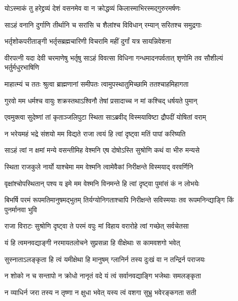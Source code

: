 \twolineshloka
{योऽस्माकं तु हरेद्द्रव्यं देशं वसनमेव वा}
{न क्रोद्धव्यं किलास्माभिरस्मद्गुरुरमर्षणः}


\twolineshloka
{साऽहं वनानि दुर्गाणि तीर्थानि च सरांसि च}
{शैलांश्च विविधान् रम्यान् सरितश्च समुद्रगाः}


\twolineshloka
{भर्तृशोकपरीताङ्गी भर्तृसब्रह्मचारिणी}
{विचरामि महीं दुर्गां यत्र सायन्निवेशना}


\threelineshloka
{वीरपत्नी यदा देवी चरमाणेषु भर्तृषु}
{साऽहं विवत्सा विधिना गन्धमादनपर्वतात्}
{शृणोमि तव सौशील्यं भर्तुर्मधुरभाषिणि}


\twolineshloka
{माहात्म्यं च ततः श्रुत्वा ब्राह्मणानां समीपतः}
{त्वामुपस्थातुमिच्छामि ततश्चाहमिहागता}


\twolineshloka
{गुरवो मम धर्मश्च वायुः शक्रस्तथाऽश्विनौ}
{तेषां प्रसादाच्च न मां कश्चिद् धर्षयते पुमान्}



\twolineshloka
{एवमुक्त्वा सुदेष्णां तां कृताञ्जलिपुटा स्थिता}
{साऽब्रवीद् विस्मयाविष्टा द्रौपदीं योषितां वराम्}


\twolineshloka
{न भरेयमहं भद्रे संशयो मम विद्यते}
{राजा त्वयं हि त्वां दृष्ट्वा मतिं पापां करिष्यति}


\twolineshloka
{साऽहं त्वां न क्षमां मन्ये वसन्तीमिह वेश्मनि}
{एष दोषोऽस्ति सुश्रोणि कथं वा भीरु मन्यसे}


\twolineshloka
{स्थिता राजकुले नार्यो याश्चेमा मम वेश्मनि}
{त्वामेवैकां निरीक्षन्ते विस्मयाद् वरवर्णिनि}


\twolineshloka
{वृक्षांश्चोपस्थितान् पश्य य इमे मम वेश्मनि}
{विनमन्ते हि त्वां दृष्ट्वा पुमांसं कं न लोभयेः}


\threelineshloka
{बिभर्षि परमं रूपमतिमानुषमद्भुतम्}
{तिर्यग्योनिगताश्चापि निरीक्षन्ते सविस्मयाः}
{तव रूपमनिन्द्याङ्गि किं पुनर्मानवा भुवि}


\twolineshloka
{राजा विराटः सुश्रोणि दृष्ट्वा ते परमं वपुः}
{मां विहाय वरारोहे त्वां गच्छेत् सर्वचेतसा}


\twolineshloka
{यं हि त्वमनवद्याङ्गी नरमायतलोचने}
{सुप्रसन्ना हि वीक्षेथाः स कामवशगो भवेत्}


\twolineshloka
{सुस्नाताऽलङ्कृता हि त्वं यमीक्षेथा हि मानुषम्}
{ग्लानिर्न तस्य दुःखं वा न तन्द्रिर्न पराजयः}


\twolineshloka
{न शोको न च सन्तापो न क्रोधो नानृतं वदे}
{यं त्वं सर्वानवद्याङ्गि भजेथाः समलङ्कृता}


\twolineshloka
{न व्याधिर्न जरा तस्य न तृष्णा न क्षुधा भवेत्}
{यस्य त्वं वशगा सुभ्रु भवेरङ्कगता सती}





